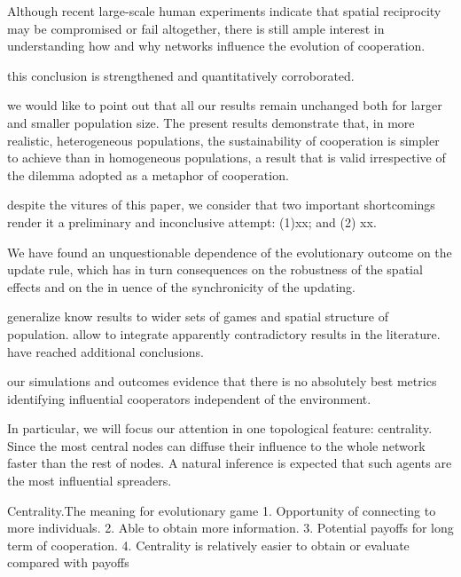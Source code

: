 \documentclass[preprint,12pt,3p]{elsarticle}
\begin{document}
Although recent large-scale human experiments indicate that spatial reciprocity
 may be compromised or fail altogether, there is still ample interest in understanding
 how and why networks influence the evolution of cooperation.

this conclusion is strengthened and quantitatively corroborated.

we would like to point out that all our results remain unchanged both for larger and smaller population size.
The present results demonstrate that, in more realistic, heterogeneous populations, the sustainability of cooperation is simpler to achieve than in homogeneous populations, a result that is valid irrespective of the dilemma adopted as a metaphor of cooperation.

despite the vitures of this paper, we consider that two important shortcomings render it a preliminary and inconclusive attempt: (1)xx; and (2) xx.

We have found an unquestionable
dependence of the evolutionary outcome on the update
rule, which has in turn consequences on the robustness
of the spatial effects and on the in
uence of the synchronicity of the updating.

generalize know results to wider sets of games and spatial structure of population.
allow to integrate apparently contradictory results in the literature.
have reached additional conclusions.

our simulations and outcomes evidence that there is no absolutely best metrics identifying influential
cooperators independent of the environment.

In particular, we will focus our attention in one topological feature: centrality.
Since the most central nodes can diffuse their influence to the whole network faster than
the rest of nodes. A natural inference is expected that such agents are the most influential spreaders.

Centrality.The meaning for evolutionary game
1. Opportunity of connecting to more individuals.
2. Able to obtain more information.
3. Potential payoffs for long term of cooperation.
4. Centrality is relatively easier to obtain or evaluate compared with payoffs

\appendix





% 
% 
% 
% 
% 
% 
% 
% 
% 
% 
% 
% 


\end{document}
